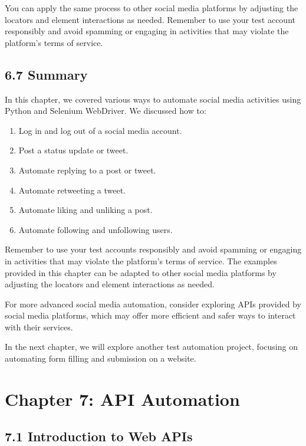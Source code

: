 \documentclass[
  paper=a4,
  ,captions=tableheading
]{scrartcl}
\providecommand{\tightlist}{%
  \setlength{\itemsep}{0pt}\setlength{\parskip}{0pt}}
\begin{document}
You can apply the same process to other social media platforms by
adjusting the locators and element interactions as needed. Remember to
use your test account responsibly and avoid spamming or engaging in
activities that may violate the platform's terms of service.

\hypertarget{summary-2}{%
\section{6.7 Summary}\label{summary-2}}

In this chapter, we covered various ways to automate social media
activities using Python and Selenium WebDriver. We discussed how to:

\begin{enumerate}
\def\labelenumi{\arabic{enumi}.}
\tightlist
\item
  Log in and log out of a social media account.
\item
  Post a status update or tweet.
\item
  Automate replying to a post or tweet.
\item
  Automate retweeting a tweet.
\item
  Automate liking and unliking a post.
\item
  Automate following and unfollowing users.
\end{enumerate}

Remember to use your test accounts responsibly and avoid spamming or
engaging in activities that may violate the platform's terms of service.
The examples provided in this chapter can be adapted to other social
media platforms by adjusting the locators and element interactions as
needed.

For more advanced social media automation, consider exploring APIs
provided by social media platforms, which may offer more efficient and
safer ways to interact with their services.

In the next chapter, we will explore another test automation project,
focusing on automating form filling and submission on a website.

\hypertarget{chapter-7-api-automation}{%
\chapter{Chapter 7: API Automation}\label{chapter-7-api-automation}}

\hypertarget{introduction-to-web-apis}{%
\section{7.1 Introduction to Web APIs}\label{introduction-to-web-apis}}
\end{document}

